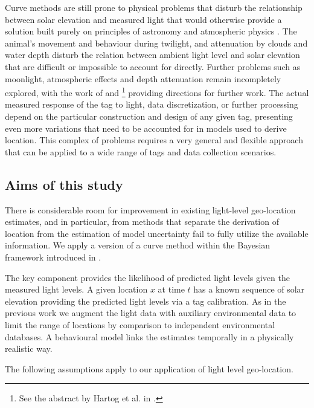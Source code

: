 \documentclass[10pt]{article}
\begin{document}
Curve methods are still prone to physical problems that disturb the
relationship between solar elevation and measured light that would
otherwise provide a solution built purely on principles of astronomy
and atmospheric physics \cite{Ekstrom2007}. The animal's movement and
behaviour during twilight, and attenuation by clouds and water depth
disturb the relation between ambient light level and solar elevation
that are difficult or impossible to account for directly.  Further
problems such as moonlight, atmospheric effects and depth attenuation
remain incompletely explored, with the work of
\cite{Ekstrom2007,sibert2007sml} and
\cite{evans2008report}\footnote{See the abstract by Hartog et al. in
  \cite{evans2008report}.} providing directions for further work.  The
actual measured response of the tag to light, data discretization, or
further processing depend on the particular construction and design of
any given tag, presenting even more variations that need to be
accounted for in models used to derive location. This complex of
problems requires a very general and flexible approach that can be
applied to a wide range of tags and data collection scenarios.


\subsection{Aims of this study}


There is considerable room for improvement in existing light-level
geo-location estimates, and in particular, from methods that separate
the derivation of location from the estimation of model uncertainty
fail to fully utilize the available information. We apply a version of
a curve method within the Bayesian framework introduced in
\cite{sumner2009}.

The key component provides the likelihood of predicted light levels
given the measured light levels. A given location $x$ at time $t$ has
a known sequence of solar elevation providing the predicted light
levels via a tag calibration. As in the previous work we augment the
light data with auxiliary environmental data to limit the range of
locations by comparison to independent environmental databases. A
behavioural model links the estimates temporally in a physically
realistic way.

The following assumptions apply to our application of light level
geo-location.
\end{document}
